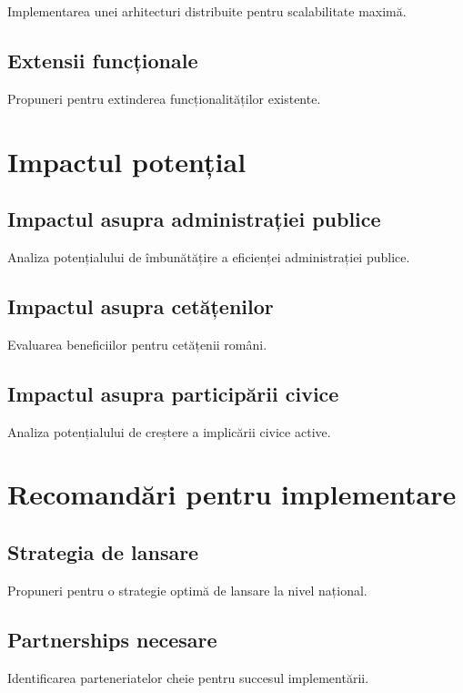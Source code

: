 \documentclass[12pt,a4paper]{report}
\begin{document}
Implementarea unei arhitecturi distribuite pentru scalabilitate maximă.

\subsection{Extensii funcționale}

Propuneri pentru extinderea funcționalităților existente.

\section{Impactul potențial}

\subsection{Impactul asupra administrației publice}

Analiza potențialului de îmbunătățire a eficienței administrației publice.

\subsection{Impactul asupra cetățenilor}

Evaluarea beneficiilor pentru cetățenii români.

\subsection{Impactul asupra participării civice}

Analiza potențialului de creștere a implicării civice active.

\section{Recomandări pentru implementare}

\subsection{Strategia de lansare}

Propuneri pentru o strategie optimă de lansare la nivel național.

\subsection{Partnerships necesare}

Identificarea parteneriatelor cheie pentru succesul implementării.
\end{document}
